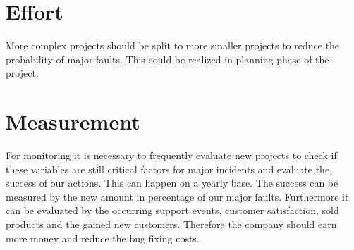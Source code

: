 \section{Effort}
More complex projects should be split to more smaller projects to reduce the probability of major faults. This could be realized in planning phase of the project.

\section{Measurement}
For monitoring it is necessary to frequently evaluate new projects to check if these variables are still critical factors for major incidents and evaluate the success of our actions. This can happen on a yearly base. The success can be measured by the new amount in percentage of our major faults. Furthermore it can be evaluated by the occurring support events, customer satisfaction, sold products and the gained new customers. Therefore the company should earn more money and reduce the bug fixing costs.
